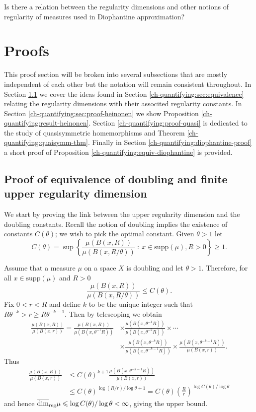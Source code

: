 \begin{question}
Is there a relation between the regularity dimensions and other notions of regularity of measures used in Diophantine approximation?
\end{question}



\section{Proofs}


This proof section will be broken into several subsections that are mostly independent of each other but the notation will remain consistent throughout. In Section \ref{ch-upper-reg:doublingproof} we cover the ideas found in Section \ref{ch-quantifying:sec:equivalence} relating the regularity dimensions with their associted regularity constants. In Section \ref{ch-quantifying:sec:proof-heinonen} we show Proposition \ref{ch-quantifying:result-heinonen}. Section \ref{ch-quantifying:proof-quasi} is dedicated to the study of quasisymmetric homemorphisms and Theorem \ref{ch-quantifying:quaisymm-thm}. Finally in Section \ref{ch-quantifying:diophantine-proof} a short proof of Proposition \ref{ch-quantifying:equiv-diophantine} is provided.


\subsection{Proof of equivalence of doubling and finite upper regularity dimension} \label{ch-upper-reg:doublingproof}


We start by proving the link between the upper regularity dimension and the doubling constants. Recall the notion of doubling implies the existence of constants $C(\theta)$; we wish to pick the optimal constant. Given $\theta > 1$ let
\[
C(\theta) = \sup \left\{ \frac{\mu(B(x,R))}{\mu(B(x,R/\theta))} \ : \ x \in \text{supp}(\mu), R>0 \right\} \geq 1.
\]

Assume that a measure $\mu$ on a space $X$ is doubling and let $\theta > 1$.  Therefore, for all $x \in \text{supp}(\mu)$ and $R>0$
\[
\frac{\mu(B(x,R))}{\mu(B(x,R/\theta))} \le C(\theta).
\]
Fix  $0< r < R$ and  define $k$ to be the unique integer such that $R\theta^{-k} > r \ge R\theta^{-k-1}$. Then by telescoping we obtain
\begin{align*}
    \frac{\mu(B(x,R))}{\mu(B(x,r))} = \frac{\mu(B(x,R))}{\mu(B(x,\theta^{-1} R))} &\times \frac{\mu(B(x,\theta^{-1} R))}{\mu(B(x,\theta^{-2} R))} \times\cdots \\
    &\times \frac{\mu(B(x,\theta^{-k} R))}{\mu(B(x,\theta^{-k-1}R))} \times \frac{\mu(B(x,\theta^{-k-1}R))}{\mu(B(x,r))}.
\end{align*}
Thus 
\begin{align*}
    \frac{\mu(B(x,R))}{\mu(B(x,r))}& \le C(\theta)^{k+1}  \frac{\mu(B(x,\theta^{-k-1}R))}{\mu(B(x,r))} \\
    &\le C(\theta)^{\log(R/r) / \log \theta+1} = C(\theta) \left(\frac{R}{r} \right)^{\log C(\theta) / \log \theta}
\end{align*}
and hence $\overline{\dim}_{\textup{reg}} \mu \leqslant \log C(\theta) / \log \theta < \infty$, giving the upper bound.


